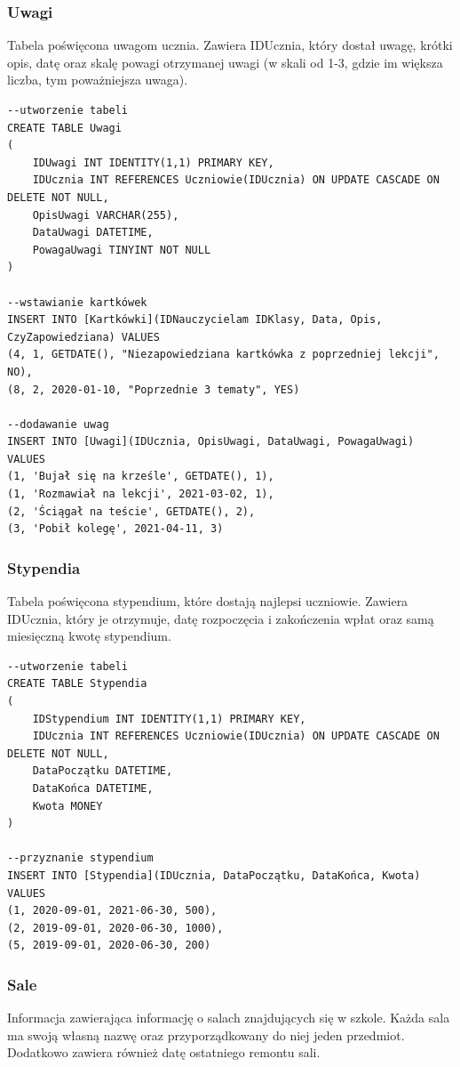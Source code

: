 \documentclass[60pt]{article}
\begin{document}
 \subsubsection{Uwagi}
Tabela poświęcona uwagom ucznia. Zawiera IDUcznia, który dostał uwagę, krótki opis, datę oraz skalę powagi otrzymanej uwagi (w skali od 1-3, gdzie im większa liczba, tym poważniejsza uwaga).
 
\begin{verbatim}
--utworzenie tabeli
CREATE TABLE Uwagi
(
	IDUwagi INT IDENTITY(1,1) PRIMARY KEY,
	IDUcznia INT REFERENCES Uczniowie(IDUcznia) ON UPDATE CASCADE ON DELETE NOT NULL,
	OpisUwagi VARCHAR(255),
	DataUwagi DATETIME,
	PowagaUwagi TINYINT NOT NULL
)

--wstawianie kartkówek
INSERT INTO [Kartkówki](IDNauczycielam IDKlasy, Data, Opis, CzyZapowiedziana) VALUES
(4, 1, GETDATE(), "Niezapowiedziana kartkówka z poprzedniej lekcji", NO), 
(8, 2, 2020-01-10, "Poprzednie 3 tematy", YES)

--dodawanie uwag
INSERT INTO [Uwagi](IDUcznia, OpisUwagi, DataUwagi, PowagaUwagi) VALUES
(1, 'Bujał się na krześle', GETDATE(), 1), 
(1, 'Rozmawiał na lekcji', 2021-03-02, 1), 
(2, 'Ściągał na teście', GETDATE(), 2), 
(3, 'Pobił kolegę', 2021-04-11, 3)
\end{verbatim}

 \subsubsection{Stypendia}
Tabela poświęcona stypendium, które dostają najlepsi uczniowie. Zawiera IDUcznia, który je otrzymuje, datę rozpoczęcia i zakończenia wpłat oraz samą miesięczną kwotę stypendium.
 
\begin{verbatim}
--utworzenie tabeli
CREATE TABLE Stypendia
(
	IDStypendium INT IDENTITY(1,1) PRIMARY KEY,
	IDUcznia INT REFERENCES Uczniowie(IDUcznia) ON UPDATE CASCADE ON DELETE NOT NULL,
	DataPoczątku DATETIME,
	DataKońca DATETIME,
	Kwota MONEY
)

--przyznanie stypendium 
INSERT INTO [Stypendia](IDUcznia, DataPoczątku, DataKońca, Kwota) VALUES
(1, 2020-09-01, 2021-06-30, 500), 
(2, 2019-09-01, 2020-06-30, 1000),
(5, 2019-09-01, 2020-06-30, 200)
\end{verbatim}

 \subsubsection{Sale}
Informacja zawierająca informację o salach znajdujących się w szkole. Każda sala ma swoją własną nazwę oraz przyporządkowany do niej jeden przedmiot. Dodatkowo zawiera również datę ostatniego remontu sali.
 
\end{document}
